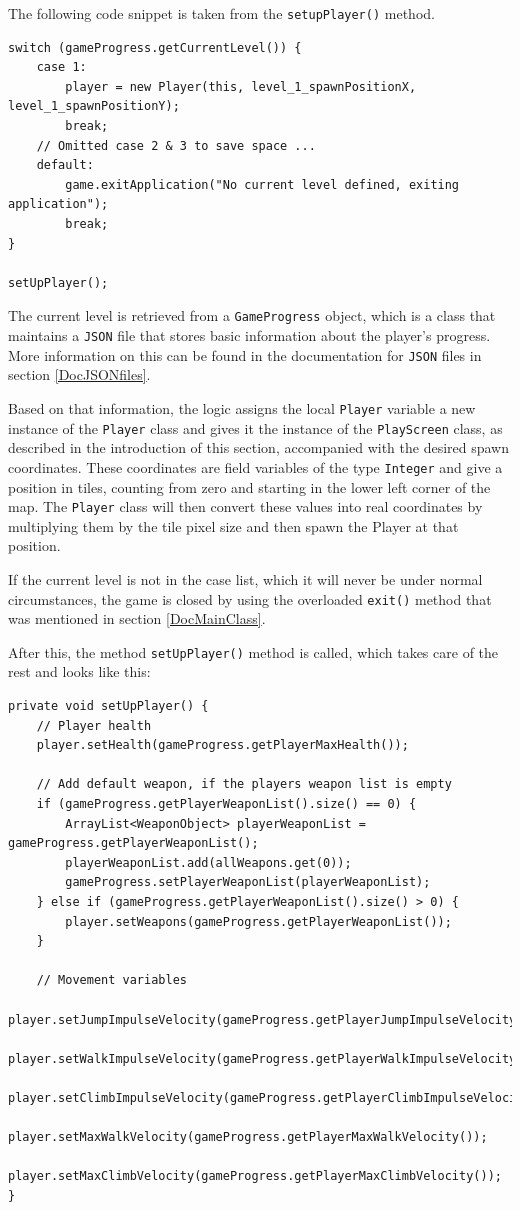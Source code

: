 \documentclass[12p]{article}
\begin{document}
The following code snippet is taken from the \texttt{setupPlayer()} method.

\begin{verbatim}
switch (gameProgress.getCurrentLevel()) {
    case 1:
        player = new Player(this, level_1_spawnPositionX, level_1_spawnPositionY);
        break;
    // Omitted case 2 & 3 to save space ...
    default:
        game.exitApplication("No current level defined, exiting application");
        break;
}

setUpPlayer();
\end{verbatim}

The current level is retrieved from a \texttt{GameProgress} object, which is a class that maintains a \texttt{JSON} file that stores basic information about the player's progress. More information on this can be found in the documentation for \texttt{JSON} files in section \ref{DocJSONfiles}.

Based on that information, the logic assigns the local \texttt{Player} variable a new instance of the \texttt{Player} class and gives it the instance of the \texttt{PlayScreen} class, as described in the introduction of this section, accompanied with the desired spawn coordinates. These coordinates are field variables of the type \texttt{Integer} and give a position in tiles, counting from zero and starting in the lower left corner of the map. The \texttt{Player} class will then convert these values into real coordinates by multiplying them by the tile pixel size and then spawn the Player at that position.

If the current level is not in the case list, which it will never be under normal circumstances, the game is closed by using the overloaded \texttt{exit()} method that was mentioned in section \ref{DocMainClass}.

After this, the method \texttt{setUpPlayer()} method is called, which takes care of the rest and looks like this:

\begin{verbatim}
private void setUpPlayer() {
    // Player health
    player.setHealth(gameProgress.getPlayerMaxHealth());

    // Add default weapon, if the players weapon list is empty
    if (gameProgress.getPlayerWeaponList().size() == 0) {
        ArrayList<WeaponObject> playerWeaponList = gameProgress.getPlayerWeaponList();
        playerWeaponList.add(allWeapons.get(0));
        gameProgress.setPlayerWeaponList(playerWeaponList);
    } else if (gameProgress.getPlayerWeaponList().size() > 0) {
        player.setWeapons(gameProgress.getPlayerWeaponList());
    }

    // Movement variables
    player.setJumpImpulseVelocity(gameProgress.getPlayerJumpImpulseVelocity());
    player.setWalkImpulseVelocity(gameProgress.getPlayerWalkImpulseVelocity());
    player.setClimbImpulseVelocity(gameProgress.getPlayerClimbImpulseVelocity());
    player.setMaxWalkVelocity(gameProgress.getPlayerMaxWalkVelocity());
    player.setMaxClimbVelocity(gameProgress.getPlayerMaxClimbVelocity());
}
\end{verbatim}
\end{document}
